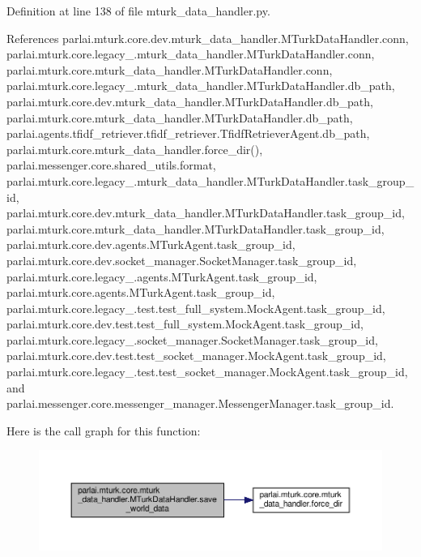 Definition at line 138 of file mturk\+\_\+data\+\_\+handler.\+py.



References parlai.\+mturk.\+core.\+dev.\+mturk\+\_\+data\+\_\+handler.\+M\+Turk\+Data\+Handler.\+conn, parlai.\+mturk.\+core.\+legacy\+\_.\+mturk\+\_\+data\+\_\+handler.\+M\+Turk\+Data\+Handler.\+conn, parlai.\+mturk.\+core.\+mturk\+\_\+data\+\_\+handler.\+M\+Turk\+Data\+Handler.\+conn, parlai.\+mturk.\+core.\+legacy\+\_.\+mturk\+\_\+data\+\_\+handler.\+M\+Turk\+Data\+Handler.\+db\+\_\+path, parlai.\+mturk.\+core.\+dev.\+mturk\+\_\+data\+\_\+handler.\+M\+Turk\+Data\+Handler.\+db\+\_\+path, parlai.\+mturk.\+core.\+mturk\+\_\+data\+\_\+handler.\+M\+Turk\+Data\+Handler.\+db\+\_\+path, parlai.\+agents.\+tfidf\+\_\+retriever.\+tfidf\+\_\+retriever.\+Tfidf\+Retriever\+Agent.\+db\+\_\+path, parlai.\+mturk.\+core.\+mturk\+\_\+data\+\_\+handler.\+force\+\_\+dir(), parlai.\+messenger.\+core.\+shared\+\_\+utils.\+format, parlai.\+mturk.\+core.\+legacy\+\_.\+mturk\+\_\+data\+\_\+handler.\+M\+Turk\+Data\+Handler.\+task\+\_\+group\+\_\+id, parlai.\+mturk.\+core.\+dev.\+mturk\+\_\+data\+\_\+handler.\+M\+Turk\+Data\+Handler.\+task\+\_\+group\+\_\+id, parlai.\+mturk.\+core.\+mturk\+\_\+data\+\_\+handler.\+M\+Turk\+Data\+Handler.\+task\+\_\+group\+\_\+id, parlai.\+mturk.\+core.\+dev.\+agents.\+M\+Turk\+Agent.\+task\+\_\+group\+\_\+id, parlai.\+mturk.\+core.\+dev.\+socket\+\_\+manager.\+Socket\+Manager.\+task\+\_\+group\+\_\+id, parlai.\+mturk.\+core.\+legacy\+\_.\+agents.\+M\+Turk\+Agent.\+task\+\_\+group\+\_\+id, parlai.\+mturk.\+core.\+agents.\+M\+Turk\+Agent.\+task\+\_\+group\+\_\+id, parlai.\+mturk.\+core.\+legacy\+\_.\+test.\+test\+\_\+full\+\_\+system.\+Mock\+Agent.\+task\+\_\+group\+\_\+id, parlai.\+mturk.\+core.\+dev.\+test.\+test\+\_\+full\+\_\+system.\+Mock\+Agent.\+task\+\_\+group\+\_\+id, parlai.\+mturk.\+core.\+legacy\+\_.\+socket\+\_\+manager.\+Socket\+Manager.\+task\+\_\+group\+\_\+id, parlai.\+mturk.\+core.\+dev.\+test.\+test\+\_\+socket\+\_\+manager.\+Mock\+Agent.\+task\+\_\+group\+\_\+id, parlai.\+mturk.\+core.\+legacy\+\_.\+test.\+test\+\_\+socket\+\_\+manager.\+Mock\+Agent.\+task\+\_\+group\+\_\+id, and parlai.\+messenger.\+core.\+messenger\+\_\+manager.\+Messenger\+Manager.\+task\+\_\+group\+\_\+id.

Here is the call graph for this function\+:
\nopagebreak
\begin{figure}[H]
\begin{center}
\leavevmode
\includegraphics[width=350pt]{classparlai_1_1mturk_1_1core_1_1mturk__data__handler_1_1MTurkDataHandler_a500ef3c8e0c9b94d7759436da43a1a62_cgraph}
\end{center}
\end{figure}


